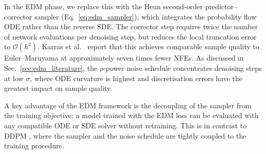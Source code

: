 In the EDM phase, we replace this with the Heun second-order 
predictor--corrector sampler (Eq.~\ref{eq:edm_sampler}), which 
integrates the probability flow ODE rather than the reverse SDE. The 
corrector step requires twice the number of network evaluations per 
denoising step, but reduces the local truncation error to 
\(\mathcal{O}(h^3)\). Karras et al.\ \cite{karras2022elucidating} report 
that this achieves comparable sample quality to Euler--Maruyama at 
approximately seven times fewer NFEs. As discussed in 
Sec.~\ref{sec:edm_literature}, the \(\rho\)-power noise schedule 
concentrates denoising steps at low \(\sigma\), where ODE curvature is 
highest and discretisation errors have the greatest impact on sample 
quality.

A key advantage of the EDM framework is the decoupling of the sampler 
from the training objective: a model trained with the EDM loss can be 
evaluated with any compatible ODE or SDE solver without retraining. This 
is in contrast to DDPM \cite{ho2020ddpm}, where the sampler and the 
noise schedule are tightly coupled to the training procedure.





